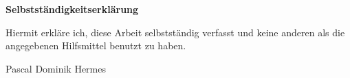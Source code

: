 \newpage
\thispagestyle{empty}

\phantom{text}
\vfill
\textbf{Selbstst\"andigkeitserkl\"arung}

Hiermit erkl\"are ich, diese Arbeit selbstst\"andig verfasst und keine anderen als die angegebenen Hilfsmittel benutzt zu haben.

\vspace{3cm}

Pascal Dominik Hermes